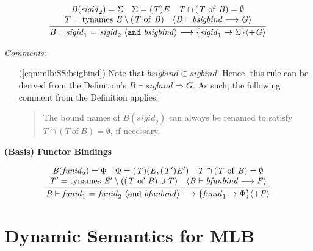 \documentclass[draft]{article}
\renewcommand{\mit}[1]{\mathit{#1}}
\newcommand{\mrm}[1]{\mathrm{#1}}
\newcommand{\mtt}[1]{\mathtt{#1}}
\newenvironment{stackAux}[2]{%
\setlength{\arraycolsep}{0pt}
\begin{array}[#1]{#2}}{
\end{array}}
\newenvironment{stackCC}{
\begin{stackAux}{c}{c}}{\end{stackAux}}
\newcommand{\infrule}[2]{{\frac{\displaystyle\strut{#1}}{\displaystyle\strut{#2}}}}
\newcommand{\judge}[2]{\infrule{#1}{#2}}
\begin{document}
\begin{equation}
\label{eqn:mlb:SS:bsigbind}
\judge{
\begin{stackCC}
\mit{B}(\mit{sigid}_2) = \Sigma \quad \Sigma = (\mit{T})\mit{E} \quad
\mit{T} \cap (\mit{T}~\mrm{of}~\mit{B}) = \emptyset \\
\mit{T} = \mrm{tynames}~\mit{E} \setminus (\mit{T}~\mrm{of}~\mit{B}) \quad
\langle\mit{B} \vdash \mit{bsigbind} \longrightarrow \mit{G}\rangle
\end{stackCC}
}{
\mit{B} \vdash \mit{sigid}_1 ~\mtt{=}~ \mit{sigid}_2 ~\langle\mtt{and}~\mit{bsigbind}\rangle \longrightarrow 
\{\mit{sigid}_1 \mapsto \Sigma\} \langle+ \mit{G}\rangle
}
\end{equation}

\begin{samepage}
\noindent
\textit{Comments}:
\begin{itemize}
\item[(\ref{eqn:mlb:SS:bsigbind})] Note that $\mit{bsigbind} \subset
\mit{sigbind}$.  Hence, this rule can be derived from the
Definition's $\mit{B} \vdash \mit{sigbind} \Rightarrow \mit{G}$.  As such, the
following comment from the Definition applies:
\begin{quote}
The bound names of $\mit{B}(\mit{sigid}_2)$ can always be renamed to
satisfy $\mit{T} \cap (\mit{T}~\mrm{of}~\mit{B}) = \emptyset$, if necessary.
\end{quote}
\end{itemize}
\end{samepage}

\vspace{2\parsep}
{\large\noindent
\textbf{(Basis) Functor Bindings} \hfill 
\fbox{$\mit{B} \vdash \mit{bfunbind} \longrightarrow \mit{F}$}
}\nopagebreak

\begin{equation}
\judge{
\begin{stackCC}
\mit{B}(\mit{funid}_2) = \Phi \quad \Phi = (\mit{T})(\mit{E},(\mit{T}')\mit{E}') \quad
\mit{T} \cap (\mit{T}~\mrm{of}~\mit{B}) = \emptyset \\
\mit{T}' = \mrm{tynames}~\mit{E}' \setminus ((\mit{T}~\mrm{of}~\mit{B}) \cup \mit{T}) \quad
\langle\mit{B} \vdash \mit{bfunbind} \longrightarrow \mit{F}\rangle
\end{stackCC}
}{
\mit{B} \vdash \mit{funid}_1 ~\mtt{=}~ \mit{funid}_2 ~\langle\mtt{and}~\mit{bfunbind}\rangle \longrightarrow 
\{\mit{funid}_1 \mapsto \Phi\} \langle+ \mit{F}\rangle
}
\end{equation}
%
\section{Dynamic Semantics for MLB}
%
\end{document}
